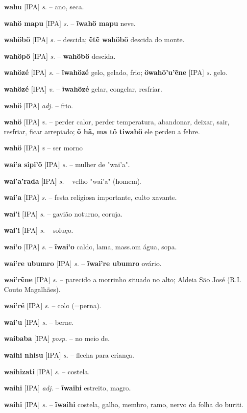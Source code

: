 \textbf{wahu} [IPA] \textit{s.} -- ano, seca.

\textbf{wahö mapu} [IPA] \textit{s.} -- \textbf{ĩwahö mapu} neve.

\textbf{wahöbö} [IPA] \textit{s.} -- descida; \textbf{ẽtẽ wahöbö} descida do monte.

\textbf{wahöpö} [IPA] \textit{s.} -- \textbf{wahöbö} descida.

\textbf{wahözé} [IPA] \textit{s.} -- \textbf{ĩwahözé} gelo, gelado, frio; \textbf{öwahö'u'ẽne} [IPA] \textit{s.} gelo.

\textbf{wahözé} [IPA] \textit{v.} -- \textbf{ĩwahözé} gelar, congelar, resfriar.

\textbf{wahö} [IPA] \textit{adj.} -- frio.

\textbf{wahö} [IPA] \textit{v.} -- perder calor, perder temperatura, abandonar, deixar, sair, resfriar, ficar arrepiado; \textbf{õ hã, ma tô tiwahö} ele perdeu a febre.

\textbf{wahö} [IPA] \textit{v} -- {ser morno}

\textbf{wai'a sipi'õ} [IPA] \textit{s.} -- mulher de "wai'a".

\textbf{wai'a'rada} [IPA] \textit{s.} -- velho "wai'a" (homem).

\textbf{wai'a} [IPA] \textit{s.} -- festa religiosa importante, culto xavante.

\textbf{wai'i} [IPA] \textit{s.} -- gavião noturno, coruja.

\textbf{wai'i} [IPA] \textit{s.} -- soluço.

\textbf{wai'o} [IPA] \textit{s.} -- \textbf{ĩwai'o} caldo, lama, mass.om água, sopa.

\textbf{wai're ubumro} [IPA] \textit{s.} -- \textbf{ĩwai're ubumro} ovário.

\textbf{wai'rẽne} [IPA] \textit{s.} -- parecido a morrinho situado no alto; Aldeia São José (R.I. Couto Magalhães).

\textbf{wai'ré} [IPA] \textit{s.} -- colo (=perna).

\textbf{wai'u} [IPA] \textit{s.} -- berne.

\textbf{waibaba} [IPA] \textit{posp.} -- no meio de.

\textbf{waihi nhisu} [IPA] \textit{s.} -- flecha para criança.

\textbf{waihizati} [IPA] \textit{s.} -- costela.

\textbf{waihi} [IPA] \textit{adj.} -- \textbf{ĩwaihi} estreito, magro.

\textbf{waihi} [IPA] \textit{s.} -- \textbf{ĩwaihi} costela, galho, membro, ramo, nervo da folha do buriti.

